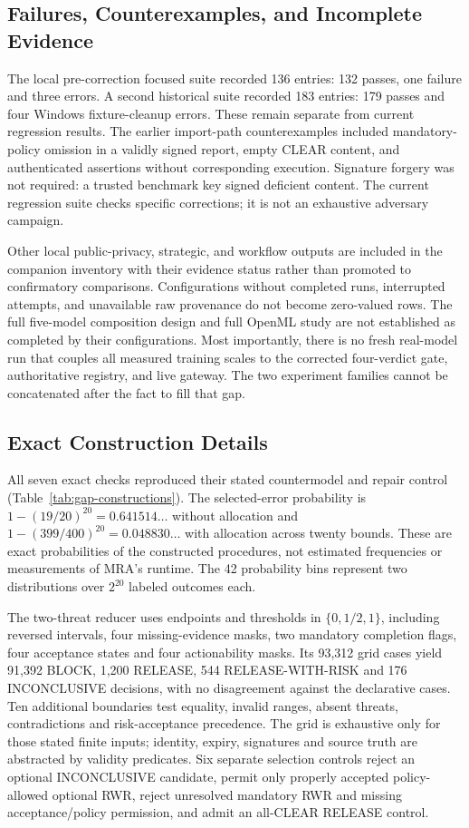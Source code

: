 \documentclass[conference,compsoc]{IEEEtran}
\begin{document}
\subsection{Failures, Counterexamples, and Incomplete Evidence}
The local pre-correction focused suite recorded 136 entries: 132 passes,
one failure and three errors. A second historical suite recorded 183 entries:
179 passes and four Windows fixture-cleanup errors. These remain separate
from current regression results. The earlier import-path counterexamples
included mandatory-policy omission in a validly signed report, empty CLEAR
content, and authenticated assertions without corresponding execution.
Signature forgery was not required: a trusted benchmark key signed deficient
content. The current regression suite checks specific corrections; it is not
an exhaustive adversary campaign.

Other local public-privacy, strategic, and workflow outputs are included in the
companion inventory with their evidence status rather than promoted to
confirmatory comparisons. Configurations without completed runs, interrupted
attempts, and unavailable raw provenance do not become zero-valued rows.
The full five-model composition design and full OpenML study are not established
as completed by their configurations. Most importantly, there is no fresh
real-model run that couples all measured training scales to the corrected
four-verdict gate, authoritative registry, and live gateway. The two experiment
families cannot be concatenated after the fact to fill that gap.

\subsection{Exact Construction Details}
\label{app:construction-detail}
All seven exact checks reproduced their stated countermodel and repair control
(Table~\ref{tab:gap-constructions}). The selected-error probability is
$1-(19/20)^{20}=0.641514\ldots$ without allocation and
$1-(399/400)^{20}=0.048830\ldots$ with allocation across twenty bounds.
These are exact probabilities of the constructed procedures, not estimated
frequencies or measurements of MRA's runtime. The 42 probability bins represent
two distributions over $2^{20}$ labeled outcomes each.

The two-threat reducer uses endpoints and thresholds in $\{0,1/2,1\}$,
including reversed intervals, four missing-evidence masks, two mandatory
completion flags, four acceptance states and four actionability masks.
Its 93,312 grid cases yield 91,392 BLOCK, 1,200 RELEASE, 544
RELEASE-WITH-RISK and 176 INCONCLUSIVE decisions, with no disagreement against
the declarative cases. Ten additional boundaries test equality, invalid ranges,
absent threats, contradictions and risk-acceptance precedence. The grid is
exhaustive only for those stated finite inputs; identity, expiry, signatures
and source truth are abstracted by validity predicates. Six separate selection
controls reject an optional INCONCLUSIVE candidate, permit only properly
accepted policy-allowed optional RWR, reject unresolved mandatory RWR and
missing acceptance/policy permission, and admit an all-CLEAR RELEASE control.
\end{document}
